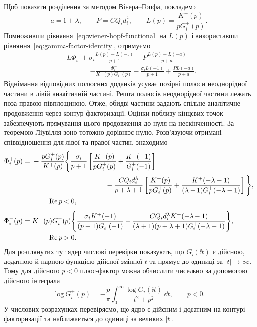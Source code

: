 Щоб показати розділення за методом Вінера--Гопфа, покладемо
\begin{equation*}
  a=1+\lambda,\qquad
  P=CQ_i d_i^\lambda,\qquad
  L(p)=\frac{K^+(p)}{pG_i^+(p)}.
\end{equation*}
Помноживши рівняння~\eqref{eq:wiener-hopf-functional} на $L(p)$ і використавши рівняння~\eqref{eq:gamma-factor-identity}, отримуємо
\begin{equation*}
\begin{aligned}
  &L\Phi_i^+
  +\sigma_i\frac{L(p)-L(-1)}{p+1}
  -P\frac{L(p)-L(-a)}{p+a}\\
  &\qquad=
  -\frac{\Phi_i^-}{K^-(p)G_i^-(p)}
  -\frac{\sigma_iL(-1)}{p+1}
  +\frac{PL(-a)}{p+a}.
\end{aligned}
\end{equation*}
Віднімання відповідних полюсних доданків усуває позірні полюси неоднорідної частини в лівій аналітичній частині. Решта полюсів неоднорідної частини лежать поза правою півплощиною. Отже, обидві частини задають спільне аналітичне продовження через контур факторизації. Оцінки поблизу кінцевих точок забезпечують прямування цього продовження до нуля на нескінченності. За теоремою Ліувілля воно тотожно дорівнює нулю. Розв’язуючи отримані співвідношення для лівої та правої частин, знаходимо
\begin{equation}
\label{eq:wiener-hopf-solution}
\begin{aligned}
  \Phi_i^+(p)={}&
  -\frac{pG_i^+(p)}{K^+(p)}
  \Bigg\{
    \frac{\sigma_i}{p+1}
    \left[
      \frac{K^+(p)}{pG_i^+(p)}
      +\frac{K^+(-1)}{G_i^+(-1)}
    \right]\\
  &\hspace{37mm}
    -\frac{CQ_i d_i^\lambda}{p+\lambda+1}
    \left[
      \frac{K^+(p)}{pG_i^+(p)}
      +\frac{K^+(-\lambda-1)}
      {(\lambda+1)G_i^+(-\lambda-1)}
    \right]
  \Bigg\},\\[-1pt]
  &\hspace{8mm}\operatorname{Re}p<0,\\[3pt]
  \Phi_i^-(p)={}&
  K^-(p)G_i^-(p)
  \Bigg\{
    \frac{\sigma_iK^+(-1)}{(p+1)G_i^+(-1)}
    -\frac{CQ_i d_i^\lambda K^+(-\lambda-1)}
    {(\lambda+1)(p+\lambda+1)G_i^+(-\lambda-1)}
  \Bigg\},\\[-1pt]
  &\hspace{8mm}\operatorname{Re}p>0.
\end{aligned}
\end{equation}
Для розглянутих тут ядер числові перевірки показують, що $G_i(\ii t)$ є дійсною, додатною й парною функцією дійсної змінної $t$ та прямує до одиниці за $|t|\to\infty$. Тому для дійсного $p<0$ плюс-фактор можна обчислити чисельно за допомогою дійсного інтеграла
\begin{equation*}
  \log G_i^+(p)
  =-\frac{p}{\pi}\int_0^\infty
    \frac{\log G_i(\ii t)}{t^2+p^2}\,\dd t,
  \qquad p<0.
\end{equation*}
У числових розрахунках перевіряємо, що ядро є дійсним і додатним на контурі факторизації та наближається до одиниці за великих $|t|$.

